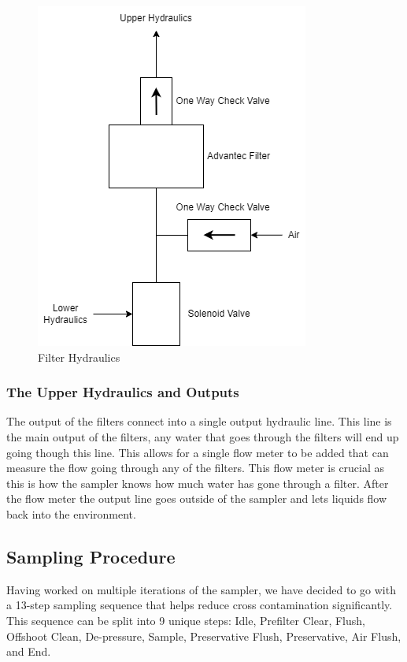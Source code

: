 \documentclass[11pt, letterpaper]{article}
\begin{document}
\begin{figure}[H]
	\centering
	\includegraphics[scale=0.75]{./Assets/PolyWAG_HX_HD_Filter.png}
	\caption{Filter Hydraulics}
\end{figure}

\subsubsection{The Upper Hydraulics and Outputs}
The output of the filters connect into a single output hydraulic line. This line is the main output of the filters, any water that goes through the filters will end up going though this line. This allows for a single flow meter to be added that can measure the flow going through any of the filters. This flow meter is crucial as this is how the sampler knows how much water has gone through a filter. After the flow meter the output line goes outside of the sampler and lets liquids flow back into the environment.


\subsection{Sampling Procedure}
\label{subsec:SP}
Having worked on multiple iterations of the sampler, we have decided to go with a 13-step sampling sequence that helps reduce cross contamination significantly. This sequence can be split into 9 unique steps: Idle, Prefilter Clear, Flush, Offshoot Clean, De-pressure, Sample, Preservative Flush, Preservative, Air Flush, and End.
\end{document}
